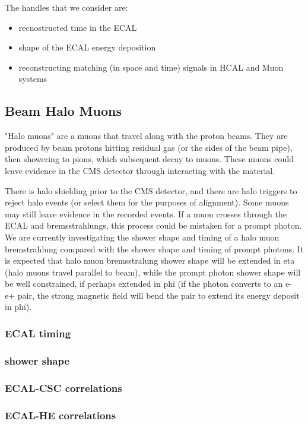 \documentclass{cmspaper}
\begin{document}
The handles that we consider are:
\begin{itemize}
\item recnostructed time in the ECAL
\item shape of the ECAL energy deposition
\item reconstructing matching (in space and time) signals in HCAL and Muon systems   
\end{itemize}

\subsection{Beam Halo Muons}

"Halo muons" are a muons that travel along with the proton beams. They are
produced by beam protons hitting residual gas (or the sides of the
beam pipe), then showering to pions, which subsequent decay to muons.
These muons could leave evidence in the CMS detector through interacting with
the material.

There is halo shielding prior to the CMS detector, and there are halo
triggers to reject halo events (or select them for the purposes of alignment). 
Some muons may still leave evidence in the recorded events.  If a muon crosses through the 
ECAL and bremsstrahlungs, this process could be mistaken for a prompt photon. 
We are currently investigating the shower shape and timing of a halo muon bremstrahlung compared with
the shower shape and timing of prompt photons.  It is expected that halo muon
bremsstralung shower shape will be extended in eta (halo muons travel
parallel to beam), while the prompt photon shower shape will be well constrained, if perhaps
extended in phi (if the photon converts to an e- e+ pair, the strong
magnetic field will bend the pair to extend its energy deposit in phi).
\subsubsection{ECAL timing}

\subsubsection{shower shape}

\subsubsection{ECAL-CSC correlations}

\subsubsection{ECAL-HE correlations}
\end{document}
